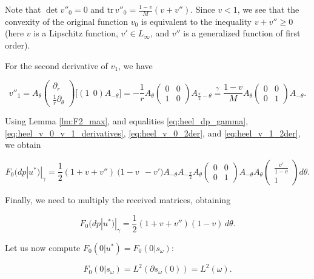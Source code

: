 \documentclass[14pt]{extarticle}
\renewcommand{\ge}{\geqslant}
\theoremstyle{remark}
\theoremstyle{definition}
\begin{document}
Note that $\det v''_0=0$ and $\mathrm{tr}\, v''_0=\frac{1-v}M (v+v'')$. Since $v<1$, we see that the convexity of the original function $v_0$ is equivalent to the inequality $v+v''\ge 0$ (here $v$ is a Lipschitz function, $v'\in L_\infty$, and $v''$ is a generalized function of first order).

For the second derivative of $v_1$, we have

\begin{equation}
\label{eq:heel_v_1_2der}
	v''_1 =
	A_\theta
	\left(\begin{array}{c}
		\partial_{r}\\
		\frac1r\partial_{\theta}
	\end{array}\right)
	\big[
		(1\ \ 0)A_{-\theta}
	\big] =
	-\frac1r A_\theta
	\left(\begin{array}{cc}
		0&0\\1&0
	\end{array}\right)
	A_{\frac\pi2-\theta} \stackrel{\gamma}{=}
	\frac{1-v}{M} A_\theta
	\left(\begin{array}{cc}
		0&0\\0&1
	\end{array}\right)
	A_{-\theta}.
\end{equation}

Using Lemma \ref{lm:F2_max}, and equalities \eqref{eq:heel_dp_gamma}, \eqref{eq:heel_v_0_v_1_derivatives}, \eqref{eq:heel_v_0_2der}, and \eqref{eq:heel_v_1_2der}, we obtain

\[
	F_0(dp|u^*)|_\gamma = 
	\frac12(1+v+v'')\ 
	\Big(1-v\ \ -v'\Big)
	A_{-\theta}A_{-\frac\pi2}A_\theta
	\left(\begin{array}{cc}
		0&0\\0&1
	\end{array}\right)
	A_{-\theta}A_\theta
	\left(\begin{array}{c}
		\frac{v'}{1-v}\\
		1
	\end{array}\right)
	d\theta.
\]

\noindent Finally, we need to multiply the received matrices, obtaining

\begin{equation}
\label{eq:heel_F2_gamma}
	F_0(dp|u^*)|_\gamma = \frac12(1+v+v'')(1-v)\,d\theta.
\end{equation}

Let us now compute $F_0(0|u^*)=F_0(0|s_\omega)$:

\[
	F_0(0|s_\omega) = L^2(\partial s_\omega(0)) = L^2(\omega).
\]
\end{document}
